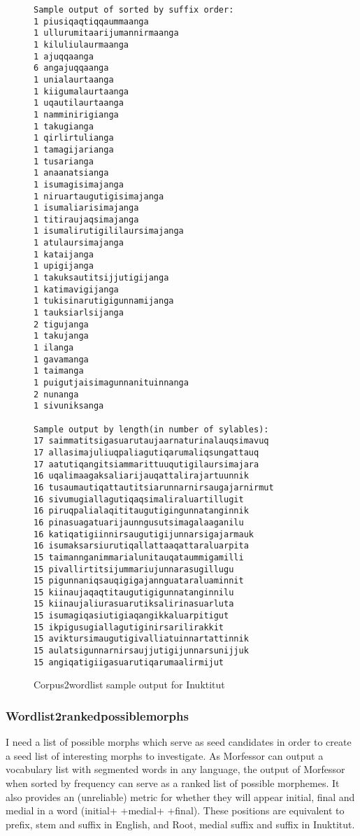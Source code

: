 \documentclass[runningheads,a4paper]{llncs}
\begin{document}
\begin{figure}
\begin{verbatim}
Sample output of sorted by suffix order:
1 piusiqaqtiqqaummaanga
1 ullurumitaarijumannirmaanga
1 kiluliulaurmaanga
1 ajuqqaanga
6 angajuqqaanga
1 unialaurtaanga
1 kiigumalaurtaanga
1 uqautilaurtaanga
1 namminirigianga
1 takugianga
1 qirlirtulianga
1 tamagijarianga
1 tusarianga
1 anaanatsianga
1 isumagisimajanga
1 niruartaugutigisimajanga
1 isumaliarisimajanga
1 titiraujaqsimajanga
1 isumalirutigililaursimajanga
1 atulaursimajanga
1 kataijanga
1 upigijanga
1 takuksautitsijjutigijanga
1 katimavigijanga
1 tukisinarutigigunnamijanga
1 tauksiarlsijanga
2 tigujanga
1 takujanga
1 ilanga
1 gavamanga
1 taimanga
1 puigutjaisimagunnanituinnanga
2 nunanga
1 sivuniksanga

Sample output by length(in number of sylables):
17 saimmatitsigasuarutaujaarnaturinalauqsimavuq
17 allasimajuliuqpaliagutiqarumaliqsungattauq
17 aatutiqangitsiammarittuuqutigilaursimajara
16 uqalimaagaksaliarijauqattalirajartuunnik
16 tusaumautiqattautitsiarunnarnirsaugajarnirmut
16 sivumugiallagutiqaqsimaliraluartillugit
16 piruqpalialaqititaugutigingunnatanginnik
16 pinasuagatuarijaunngusutsimagalaaganilu
16 katiqatigiinnirsaugutigijunnarsigajarmauk
16 isumaksarsiurutiqallattaaqattaraluarpita
15 taimannganimmarialunitauqataummigamilli
15 pivallirtitsijummariujunnarasugillugu
15 pigunnaniqsauqigigajannguataraluaminnit
15 kiinaujaqaqtitaugutigigunnatanginnilu
15 kiinaujaliurasuarutiksalirinasuarluta
15 isumagiqasiutigiaqangikkaluarpitigut
15 ikpigusugiallagutiginirsarilirakkit
15 aviktursimaugutigivalliatuinnartattinnik
15 aulatsigunnarnirsaujjutigijunnarsunijjuk
15 angiqatigiigasuarutiqarumaalirmijut
\end{verbatim}
	\caption{Corpus2wordlist sample output for Inuktitut}
	\label{fig:corpus2wordlistoutput}
\end{figure}



\subsubsection{Wordlist2rankedpossiblemorphs}

I need a list of possible morphs which serve as seed candidates in order to create a seed list of interesting morphs to investigate.  As Morfessor can output a vocabulary list with segmented words in any language, the output of Morfessor when sorted by frequency can serve as a ranked list of possible morphemes. It also provides an (unreliable) metric for whether they will appear initial, final and medial in a word (initial+ +medial+ +final). These positions are equivalent to prefix, stem and suffix in English, and Root, medial suffix and suffix in Inuktitut. 
\end{document}
